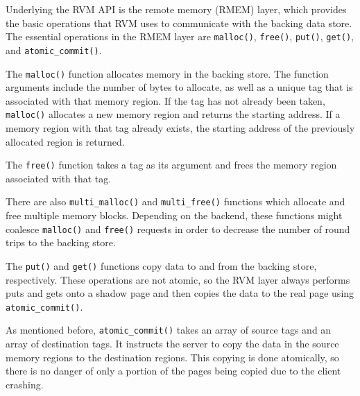 Underlying the RVM API is the remote memory (RMEM) layer, which provides the
basic operations that RVM uses to communicate with the backing data store.
The essential operations in the RMEM layer are \texttt{malloc()},
\texttt{free()}, \texttt{put()}, \texttt{get()}, and \texttt{atomic\_commit()}.

The \texttt{malloc()} function allocates memory in the backing store.
The function arguments include the number of bytes to allocate, as well as
a unique tag that is associated with that memory region. If the tag has not
already been taken, \texttt{malloc()} allocates a new memory region and returns
the starting address. If a memory region with that tag already exists, the
starting address of the previously allocated region is returned.

The \texttt{free()} function takes a tag as its argument and frees the memory
region associated with that tag.

There are also \texttt{multi\_malloc()} and \texttt{multi\_free()} functions
which allocate and free multiple memory blocks. Depending on the backend,
these functions might coalesce \texttt{malloc()} and \texttt{free()} requests
in order to decrease the number of round trips to the backing store.

The \texttt{put()} and \texttt{get()} functions copy data to and from the
backing store, respectively. These operations are not atomic, so the RVM
layer always performs puts and gets onto a shadow page and then copies the
data to the real page using \texttt{atomic\_commit()}.

As mentioned before, \texttt{atomic\_commit()} takes an array of source tags
and an array of destination tags. It instructs the server to copy the data
in the source memory regions to the destination regions. This copying is
done atomically, so there is no danger of only a portion of the pages
being copied due to the client crashing.
